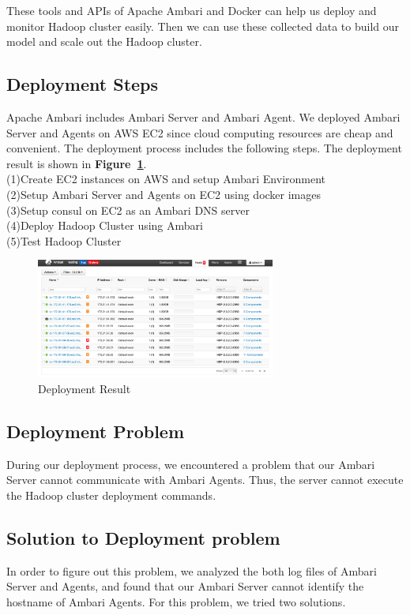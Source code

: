 \documentclass{article}
\begin{document}
These tools and APIs of Apache Ambari and Docker can help us deploy and monitor Hadoop cluster easily. Then we can use these collected data to build our model and scale out the Hadoop cluster.

\subsection{Deployment Steps}
Apache Ambari includes Ambari Server and Ambari Agent. We deployed Ambari Server and Agents on AWS EC2 since cloud computing resources are cheap and convenient. The deployment process includes the following steps. The deployment result is shown in \textbf{Figure~\ref{fig:deploymentResult}}. \\
(1)Create EC2 instances on AWS and setup Ambari Environment\\
(2)Setup Ambari Server and Agents on EC2 using docker images\\
(3)Setup consul on EC2 as an Ambari DNS server\\
(4)Deploy Hadoop Cluster using Ambari\\
(5)Test Hadoop Cluster\\
\begin{figure}[ht!]
 \centering
 \includegraphics[width=0.7\textwidth,natwidth=1200,natheight=400]{deployment.png}
 \caption{Deployment Result}
  \label{fig:deploymentResult}
 \end{figure}

\subsection{Deployment Problem}
During our deployment process, we encountered a problem that our Ambari Server cannot communicate with Ambari Agents. Thus, the server cannot execute the Hadoop cluster deployment commands.
\subsection{Solution to Deployment problem}
In order to figure out this problem, we analyzed the both log files of Ambari Server and Agents, and found that our Ambari Server cannot identify the hostname of Ambari Agents. For this problem, we tried two solutions.
\end{document}
